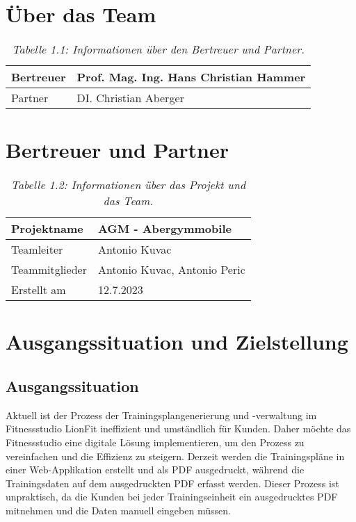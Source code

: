\section{Über das Team}
\begin{table}[h]
    \centering
    \caption{\textit{Tabelle 1.1: Informationen über den Bertreuer und Partner.}}
    \begin{tabular}{|p{}|p{}|}
        \hline
        Bertreuer & Prof. Mag. Ing. Hans Christian Hammer \\ \hline
        Partner & DI. Christian Aberger \\ \hline
    \end{tabular}
\end{table}

\section{Bertreuer und Partner}
\begin{table}[h]
    \centering
    \caption{\textit{Tabelle 1.2: Informationen über das Projekt und das Team.}}
    \begin{tabular}{|p{}|p{}|}
        \hline
        Projektname & AGM - Abergymmobile \\ \hline
        Teamleiter & Antonio Kuvac \\ \hline
        Teammitglieder & Antonio Kuvac, Antonio Peric \\ \hline
        Erstellt am & 12.7.2023 \\ \hline
    \end{tabular}
\end{table}

\section{Ausgangssituation und Zielstellung}

\subsection{Ausgangssituation}
Aktuell ist der Prozess der Trainingsplangenerierung und -verwaltung im 
Fitnessstudio LionFit ineffizient und umständlich für Kunden. 
Daher möchte das Fitnessstudio eine digitale Lösung implementieren,
um den Prozess zu vereinfachen und die Effizienz zu steigern. 
Derzeit werden die Trainingspläne in einer Web-Applikation 
erstellt und als PDF ausgedruckt, während die Trainingsdaten 
auf dem ausgedruckten PDF erfasst werden. Dieser Prozess ist 
unpraktisch, da die Kunden bei jeder Trainingseinheit ein 
ausgedrucktes PDF mitnehmen und die Daten manuell eingeben müssen.


